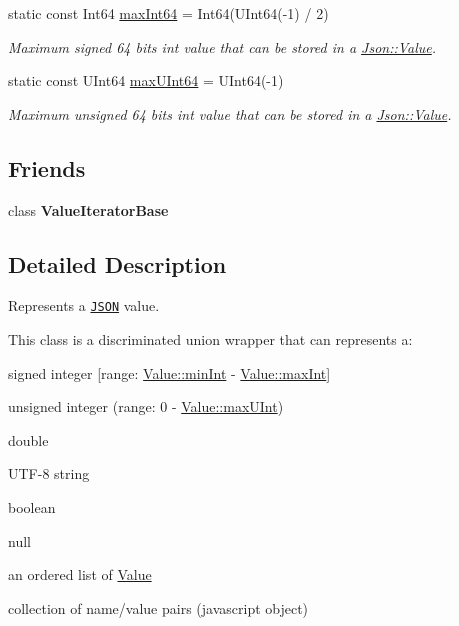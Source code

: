 \begin{DoxyCompactItemize}
\mbox{\label{class_json_1_1_value_a4492634870b8c5709ce967b384ac6006}} 
static const Int64 \hyperlink{class_json_1_1_value_a4492634870b8c5709ce967b384ac6006}{max\+Int64} = Int64(U\+Int64(-\/1) / 2)
\begin{DoxyCompactList}\small\item\em Maximum signed 64 bits int value that can be stored in a \hyperlink{class_json_1_1_value}{Json\+::\+Value}. \end{DoxyCompactList}\item 
\mbox{\label{class_json_1_1_value_ae1eb89c305c39516696ff305cffa01da}} 
static const U\+Int64 \hyperlink{class_json_1_1_value_ae1eb89c305c39516696ff305cffa01da}{max\+U\+Int64} = U\+Int64(-\/1)
\begin{DoxyCompactList}\small\item\em Maximum unsigned 64 bits int value that can be stored in a \hyperlink{class_json_1_1_value}{Json\+::\+Value}. \end{DoxyCompactList}\end{DoxyCompactItemize}
\subsection*{Friends}
\begin{DoxyCompactItemize}
\item 
\mbox{\label{class_json_1_1_value_ad016df56489e5d360735457afba2f649}} 
class {\bfseries Value\+Iterator\+Base}
\end{DoxyCompactItemize}


\subsection{Detailed Description}
Represents a \href{http://www.json.org}{\tt J\+S\+ON} value. 

This class is a discriminated union wrapper that can represents a\+:
\begin{DoxyItemize}
\item signed integer \mbox{[}range\+: \hyperlink{class_json_1_1_value_a7df8a39e2502b8c92a6a41e3d752d2c8}{Value\+::min\+Int} -\/ \hyperlink{class_json_1_1_value_a978c799a8af3114ef7dab6fd0a310a1b}{Value\+::max\+Int}\mbox{]}
\item unsigned integer (range\+: 0 -\/ \hyperlink{class_json_1_1_value_ac79e63ee68d3aa914bfd6988be669b87}{Value\+::max\+U\+Int})
\item double
\item U\+T\+F-\/8 string
\item boolean
\item \textquotesingle{}null\textquotesingle{}
\item an ordered list of \hyperlink{class_json_1_1_value}{Value}
\item collection of name/value pairs (javascript object)
\end{DoxyItemize}

